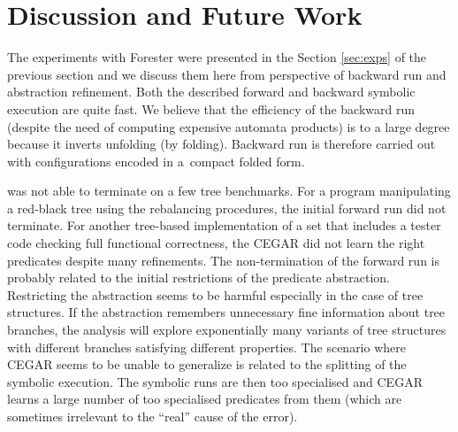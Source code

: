{%
%
%
\section{Discussion and Future Work}

The experiments with Forester were presented in the Section \ref{sec:exps} of the previous section and
we discuss them here from perspective of backward run and abstraction refinement.
Both the described forward and backward symbolic execution are quite fast.
We believe that the efficiency of the backward run (despite the need of computing expensive automata products) is to a large degree because it inverts unfolding (by folding). 
Backward run is therefore carried out with configurations encoded in a~compact folded form. 

\forester{} was not able to terminate on a few tree benchmarks.  
For a program manipulating a red-black tree using the rebalancing procedures, 
the initial forward run did not terminate.  
For another tree-based implementation of a set that includes a tester code checking full functional correctness, the CEGAR did not learn the right
predicates despite many refinements.
%
The non-termination of the forward run is probably related to the initial
restrictions of the predicate abstraction. Restricting the abstraction seems to be harmful especially in the case of tree structures. 
If the abstraction remembers unnecessary fine information about tree branches, the analysis will explore exponentially many variants of tree structures with different branches satisfying different properties.
%
The scenario where CEGAR seems to be unable to generalize is related to the splitting of the symbolic execution. The symbolic runs are then too specialised and CEGAR learns a large number of too specialised predicates from them (which are sometimes irrelevant to the ``real'' cause of the error). 
%

}
